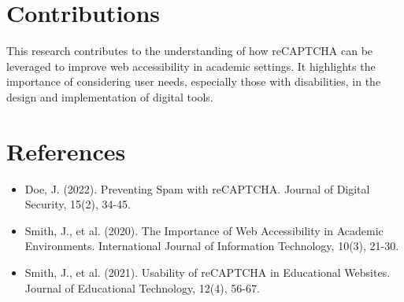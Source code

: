 \documentclass{article}
\begin{document}
\section{Contributions}
This research contributes to the understanding of how reCAPTCHA can be leveraged to improve web accessibility in academic settings. It highlights the importance of considering user needs, especially those with disabilities, in the design and implementation of digital tools.

\section*{References}
\begin{itemize}
    \item Doe, J. (2022). Preventing Spam with reCAPTCHA. Journal of Digital Security, 15(2), 34-45.
    \item Smith, J., et al. (2020). The Importance of Web Accessibility in Academic Environments. International Journal of Information Technology, 10(3), 21-30.
    \item Smith, J., et al. (2021). Usability of reCAPTCHA in Educational Websites. Journal of Educational Technology, 12(4), 56-67.
\end{itemize}
\end{document}
